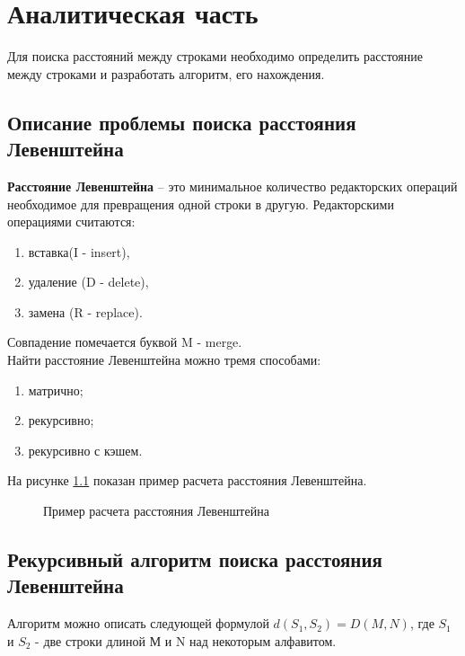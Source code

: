 \chapter{Аналитическая часть}\label{Analis}

Для поиска расстояний между строками необходимо определить расстояние между строками и разработать алгоритм, его нахождения.

\section{Описание проблемы поиска расстояния Левенштейна}\label{LeventsheinProblem}

\textbf{Расстояние Левенштейна} -- это минимальное количество редакторских операций необходимое для 
превращения одной строки в другую. \cite{levenshtein} Редакторскими операциями считаются: %
\begin{enumerate}
  \item вставка(I - insert), 
  \item удаление (D - delete), 
  \item замена (R - replace).
\end{enumerate}
Совпадение помечается буквой M - merge.
\\

Найти расстояние Левенштейна можно тремя способами:
\begin{enumerate}
  \item матрично;
  \item рекурсивно;
  \item рекурсивно с кэшем.
\end{enumerate}

На рисунке \ref{ris:levenshtein_example} показан пример расчета расстояния Левенштейна.

\begin{figure}[H]
  \caption{Пример расчета расстояния Левенштейна}
  \label{ris:levenshtein_example}
\end{figure}


\section{Рекурсивный алгоритм поиска расстояния Левенштейна}\label{RecursiveLeventshein}

Алгоритм можно описать следующей формулой $d(S_1, S_2) = D(M,N)$, где $S_1$ и $S_2$ - две строки длиной М и N над некоторым алфавитом. 



